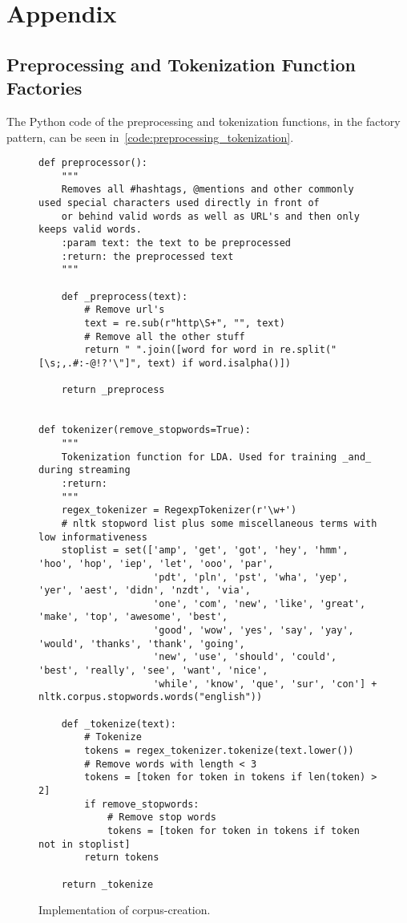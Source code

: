 \chapter{Appendix}
\label{ch:appendix}

\section{Preprocessing and Tokenization Function Factories}
\label{sec:preprocessingAndTokenizationFunctionFactories}
The Python code of the preprocessing and tokenization functions,
in the factory pattern, can be seen in~\autoref{code:preprocessing_tokenization}.

\begin{figure}
    \caption{Implementation of corpus-creation.}
    \label{code:preprocessing_tokenization}
    \begin{verbatim}
def preprocessor():
    """
    Removes all #hashtags, @mentions and other commonly used special characters used directly in front of
    or behind valid words as well as URL's and then only keeps valid words.
    :param text: the text to be preprocessed
    :return: the preprocessed text
    """

    def _preprocess(text):
        # Remove url's
        text = re.sub(r"http\S+", "", text)
        # Remove all the other stuff
        return " ".join([word for word in re.split("[\s;,.#:-@!?'\"]", text) if word.isalpha()])

    return _preprocess


def tokenizer(remove_stopwords=True):
    """
    Tokenization function for LDA. Used for training _and_ during streaming
    :return:
    """
    regex_tokenizer = RegexpTokenizer(r'\w+')
    # nltk stopword list plus some miscellaneous terms with low informativeness
    stoplist = set(['amp', 'get', 'got', 'hey', 'hmm', 'hoo', 'hop', 'iep', 'let', 'ooo', 'par',
                    'pdt', 'pln', 'pst', 'wha', 'yep', 'yer', 'aest', 'didn', 'nzdt', 'via',
                    'one', 'com', 'new', 'like', 'great', 'make', 'top', 'awesome', 'best',
                    'good', 'wow', 'yes', 'say', 'yay', 'would', 'thanks', 'thank', 'going',
                    'new', 'use', 'should', 'could', 'best', 'really', 'see', 'want', 'nice',
                    'while', 'know', 'que', 'sur', 'con'] + nltk.corpus.stopwords.words("english"))

    def _tokenize(text):
        # Tokenize
        tokens = regex_tokenizer.tokenize(text.lower())
        # Remove words with length < 3
        tokens = [token for token in tokens if len(token) > 2]
        if remove_stopwords:
            # Remove stop words
            tokens = [token for token in tokens if token not in stoplist]
        return tokens

    return _tokenize
    \end{verbatim}
\end{figure}

\newpage
